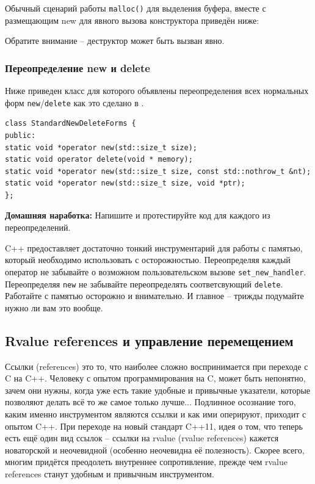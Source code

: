 \documentclass[a4paper,12pt,oneside]{article}
\begin{document}
Обычный сценарий работы \lstinline!malloc()! для выделения буфера, вместе с размещающим new для явного вызова конструктора приведён ниже:



Обратите внимание -- деструктор может быть вызван явно.

\subsubsection{Переопределение new и delete}\label{NewOverloading}

Ниже приведен класс для которого объявлены переопределения всех нормальных форм \lstinline!new!/\lstinline!delete! как это сделано в \cite{effcpp3d}.

\begin{lstlisting}
class StandardNewDeleteForms {
public:
static void *operator new(std::size_t size);
static void operator delete(void * memory);
static void *operator new(std::size_t size, const std::nothrow_t &nt);
static void *operator new(std::size_t size, void *ptr);
};
\end{lstlisting}

\textbf{Домашняя наработка:} Напишите и протестируйте код для каждого из переопределений.

C++ предоставляет достаточно тонкий инструментарий для работы с памятью, который необходимо использовать с осторожностью. Переопределяя каждый оператор не забывайте о возможном пользовательском вызове \lstinline!set_new_handler!. Переопределяя \lstinline!new! не забывайте переопределять соответсвующий \lstinline!delete!. Работайте с памятью осторожно и внимательно. И главное -- трижды подумайте нужно ли вам это вообще.

\pagebreak
\subsection{Rvalue references и управление перемещением}

Ссылки (references) это то, что наиболее сложно воспринимается при переходе с C на C++. Человеку с опытом программирования на C, может быть непонятно, зачем они нужны, когда уже есть такие удобные и привычные указатели, которые позволяют делать всё то же самое только лучше... Подлинное осознание того, каким именно инструментом являются ссылки и как ими оперируют, приходит с опытом C++. При переходе на новый стандарт C++11, идея о том, что теперь есть ещё один вид ссылок -- ссылки на rvalue (rvalue references) кажется новаторской и неочевидной (особенно неочевидна её полезность). Скорее всего, многим придётся преодолеть внутреннее сопротивление, прежде чем rvalue references станут удобным и привычным инструментом. 
\end{document}
